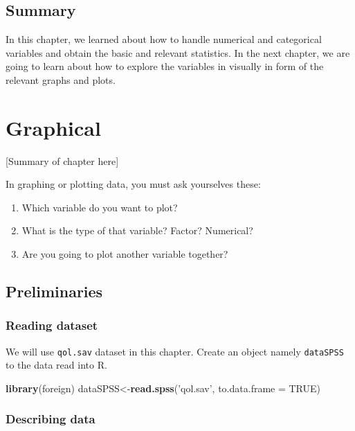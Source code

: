 \documentclass[]{book}
\newenvironment{Shaded}{\begin{snugshade}}{\end{snugshade}}
\newcommand{\KeywordTok}[1]{\textcolor[rgb]{0.13,0.29,0.53}{\textbf{{#1}}}}
\newcommand{\DataTypeTok}[1]{\textcolor[rgb]{0.13,0.29,0.53}{{#1}}}
\newcommand{\StringTok}[1]{\textcolor[rgb]{0.31,0.60,0.02}{{#1}}}
\newcommand{\OtherTok}[1]{\textcolor[rgb]{0.56,0.35,0.01}{{#1}}}
\newcommand{\NormalTok}[1]{{#1}}
\providecommand{\tightlist}{%
  \setlength{\itemsep}{0pt}\setlength{\parskip}{0pt}}
\theoremstyle{definition}
\theoremstyle{definition}
\theoremstyle{remark}
\begin{document}
\section{Summary}\label{summary}

In this chapter, we learned about how to handle numerical and
categorical variables and obtain the basic and relevant statistics. In
the next chapter, we are going to learn about how to explore the
variables in visually in form of the relevant graphs and plots.

\chapter{Graphical}\label{graphical}

{[}Summary of chapter here{]}

In graphing or plotting data, you must ask yourselves these:

\begin{enumerate}
\def\labelenumi{\arabic{enumi}.}
\tightlist
\item
  Which variable do you want to plot?
\item
  What is the type of that variable? Factor? Numerical?
\item
  Are you going to plot another variable together?
\end{enumerate}

\section{Preliminaries}\label{preliminaries}

\subsection{Reading dataset}\label{reading-dataset}

We will use \texttt{qol.sav} dataset in this chapter. Create an object
namely \texttt{dataSPSS} to the data read into R.

\begin{Shaded}
\begin{Highlighting}[]
\KeywordTok{library}\NormalTok{(foreign)}
\NormalTok{dataSPSS<-}\KeywordTok{read.spss}\NormalTok{(}\StringTok{'qol.sav'}\NormalTok{, }\DataTypeTok{to.data.frame =} \OtherTok{TRUE}\NormalTok{)}
\end{Highlighting}
\end{Shaded}

\subsection{Describing data}\label{describing-data}
\end{document}
